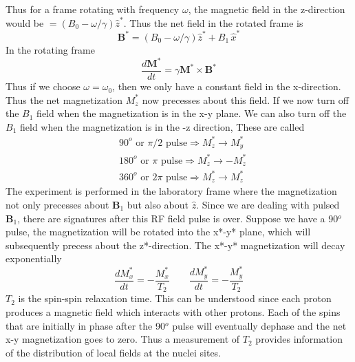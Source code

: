 \documentclass[aps,prb,onecolumn,notitlepage,showpacs,floatfix,superscriptaddress]{revtex4-1}
\begin{document}
Thus for a frame rotating with frequency $\omega$, the magnetic field in the z-direction would be $ = (B_0 - \omega /\gamma)\hat{z}^*$. Thus the net field in the rotated frame is
\begin{equation}
{\bm B}^* = (B_0 - \omega /\gamma)\hat{z}^* + B_1 \, \hat{x}^*
\end{equation}
In the rotating frame
\begin{equation}
 \dfrac{d {\bm M}^*}{dt} =\gamma {\bm M}^* \times {\bm B}^* 
\end{equation}
Thus if we choose $\omega=\omega_0$, then we only have a constant field in the x-direction. Thus the net magnetization $M_z^*$ now precesses about this field. If we now turn off the $B_1$ field when the magnetization is in the x-y plane. We can also turn off the $B_1$ field when the magnetization is in the -z direction, These are called
\begin{equation}
\begin{split}
&90^o \,\,\text{or} \,\, \pi/2 \,\, \text{pulse} \Rightarrow M_z^* \rightarrow M_y^* \\
&180^o \,\,\text{or} \,\, \pi \,\, \text{pulse} \Rightarrow M_z^* \rightarrow -M_z^* \\
&360^o \,\,\text{or} \,\, 2\pi \,\, \text{pulse} \Rightarrow M_z^* \rightarrow M_z^* 
\end{split}
\end{equation}
The experiment is performed in the laboratory frame where the magnetization not only precesses about ${\bm B_1}$ but also about $\hat{z}$. Since we are dealing with pulsed ${\bm B}_1$, there are signatures after this RF field pulse is over. Suppose we have a 90$^o$ pulse, the magnetization will be rotated into the x*-y* plane, which will subsequently precess about the z*-direction. The x*-y* magnetization will decay exponentially
\begin{equation}
\dfrac{d M_x^*}{dt} =-\dfrac{M_x^*}{T_2} \qquad \dfrac{d M_y^*}{dt} =-\dfrac{M_y^*}{T_2}
\end{equation}
$T_2$ is the spin-spin relaxation time. This can be understood since each proton produces a magnetic field which interacts with other protons. Each of the spins that are initially in phase after the 90$^o$ pulse will eventually dephase and the net x-y magnetization goes to zero. Thus a measurement of $T_2$ provides information of the distribution of local fields at the nuclei sites.
\end{document}
